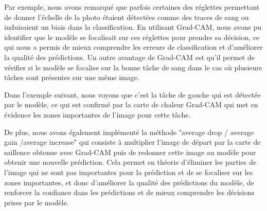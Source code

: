 Par exemple, nous avons remarqué que parfois certaines des réglettes permettant de donner l'échelle de la photo étaient détectées comme des traces de sang ou induisaient un biais dans la classification.
En utilisant Grad-CAM, nous avons pu identifier que le modèle se focalisait sur ces réglettes pour prendre sa décision, ce qui nous a permis de mieux comprendre
les erreurs de classification et d'améliorer la qualité des prédictions.
Un autre avantage de Grad-CAM est qu'il permet de vérifier si le modèle se focalise sur la bonne tâche de sang
dans le cas où plusieurs tâches sont présentes sur une même image.

Dans l'exemple suivant, nous voyons que c'est la tâche de gauche qui est détectée par le modèle, ce qui est confirmé par la carte de chaleur Grad-CAM qui met en évidence les zones importantes de l'image pour cette tâche.


De plus, nous avons également implémenté la méthode "average drop / average gain /average increase" qui consiste à multiplier l'image de départ par la carte de saillence obtenue avec Grad-CAM puis de redonner cette image au modèle
pour obtenir une nouvelle prédiction.
Cela permet en théorie d'éliminer les parties de l'image qui ne sont pas importantes pour la prédiction et de se focaliser sur les zones importantes, et 
donc d'améliorer la qualité des prédictions du modèle, de renforcer la confiance dans les prédictions et de mieux comprendre les décisions prises par le modèle.





